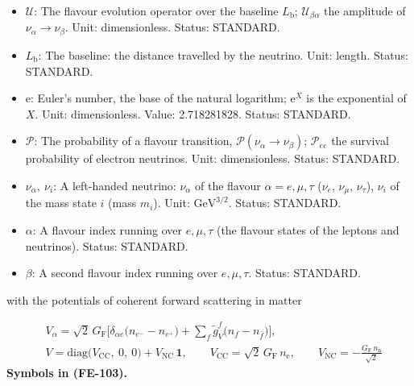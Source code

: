 \documentclass[
  10pt,
]{article}
\begin{document}
\begin{itemize}
  \(3 \times 3\) matrix of the potentials in the flavour basis;
  antineutrinos have \(-V\). Unit: GeV. Status: STANDARD.
\item
  \(\mathcal{U}\): The flavour evolution operator over the baseline
  \(L_{\mathrm{b}}\); \(\mathcal{U}_{\beta\alpha}\) the amplitude of
  \(\nu_\alpha \to \nu_\beta\). Unit: dimensionless. Status: STANDARD.
\item
  \(L_{\mathrm{b}}\): The baseline: the distance travelled by the
  neutrino. Unit: length. Status: STANDARD.
\item
  \(\mathrm{e}\): Euler's number, the base of the natural logarithm;
  \(\mathrm{e}^{X}\) is the exponential of \(X\). Unit: dimensionless.
  Value: 2.718281828. Status: STANDARD.
\item
  \(\mathcal{P}\): The probability of a flavour transition,
  \(\mathcal{P}(\nu_\alpha \to \nu_\beta)\); \(\mathcal{P}_{ee}\) the
  survival probability of electron neutrinos. Unit: dimensionless.
  Status: STANDARD.
\item
  \(\nu_\alpha,\ \nu_i\): A left-handed neutrino: \(\nu_\alpha\) of the
  flavour \(\alpha = e, \mu, \tau\) (\(\nu_e\), \(\nu_\mu\),
  \(\nu_\tau\)), \(\nu_i\) of the mass state \(i\) (mass \(m_i\)). Unit:
  \(\mathrm{GeV}^{3/2}\). Status: STANDARD.
\item
  \(\alpha\): A flavour index running over \(e, \mu, \tau\) (the flavour
  states of the leptons and neutrinos). Status: STANDARD.
\item
  \(\beta\): A second flavour index running over \(e, \mu, \tau\).
  Status: STANDARD.
\end{itemize}

with the potentials of coherent forward scattering in matter

\[
\begin{aligned}
&V_\alpha = \sqrt2\,G_{\mathrm{F}}\Big[\delta_{\alpha e}\big(n_{e^-} - n_{e^+}\big) + \sum_f\tilde
 g^f_V\big(n_f - n_{\bar f}\big)\Big],\\
&V = \mathrm{diag}\big(V_{\mathrm{CC}},\ 0,\ 0\big) + V_{\mathrm{NC}}\,\mathbf{1},\qquad V_{\mathrm{CC}}
 = \sqrt2\,G_{\mathrm{F}}\,n_{\mathrm{e}},
 \qquad V_{\mathrm{NC}} = -\frac{G_{\mathrm{F}}\,n_{\mathrm{n}}}{\sqrt2}
\end{aligned} \tag{FE-103}
\] \textbf{Symbols in (FE-103).}
\end{document}
